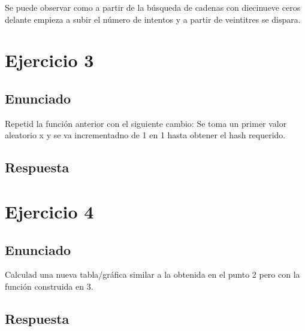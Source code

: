 \documentclass[10pt,a4paper,spanish]{report}
\begin{document}
\noindent
Se puede observar como a partir de la búsqueda de cadenas con diecinueve ceros delante empieza a subir el número de intentos y a partir de veintitres se dispara.

\chapter{Ejercicio 3}

\section{Enunciado}
\noindent
Repetid la función anterior con el siguiente cambio: Se toma un primer valor aleatorio x y se va incrementadno de 1 en 1 hasta obtener el hash requerido.

\section{Respuesta}
\noindent

\chapter{Ejercicio 4}

\section{Enunciado}
\noindent
Calculad una nueva tabla/gráfica similar a la obtenida en el punto 2 pero con la función construida en 3.

\section{Respuesta}
\noindent

\end{document}
